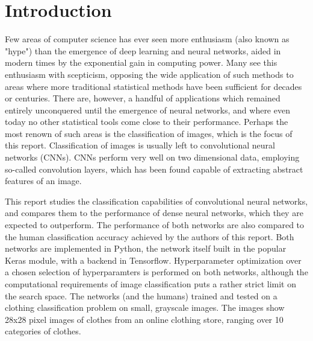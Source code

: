 \documentclass[10pt, twocolumn]{article}
\begin{document}
\vfill

\pagebreak

\restoregeometry

\onecolumn
\tableofcontents
\twocolumn
\pagebreak

\section{Introduction}
Few areas of computer science has ever seen more enthusiasm (also known as "hype") than the emergence of deep learning and neural networks, aided in modern times by the exponential gain in computing power. Many see this enthusiasm with scepticism, opposing the wide application of such methods to areas where more traditional statistical methods have been sufficient for decades or centuries. There are, however, a handful of applications which remained entirely unconquered until the emergence of neural networks, and where even today no other statistical tools come close to their performance. Perhaps the most renown of such areas is the classification of images, which is the focus of this report. Classification of images is usually left to convolutional neural networks (CNNs). CNNs perform very well on two dimensional data, employing so-called convolution layers, which has been found capable of extracting abstract features of an image.

This report studies the classification capabilities of convolutional neural networks, and compares them to the performance of dense neural networks, which they are expected to outperform. The performance of both networks are also compared to the human classification accuracy achieved by the authors of this report. Both networks are implemented in Python, the network itself built in the popular Keras module, with a backend in Tensorflow. Hyperparameter optimization over a chosen selection of hyperparamters is performed on both networks, although the computational requirements of image classification puts a rather strict limit on the search space. The networks (and the humans) trained and tested on a clothing classification problem on small, grayscale images. The images show 28x28 pixel images of clothes from an online clothing store, ranging over 10 categories of clothes.
\end{document}
